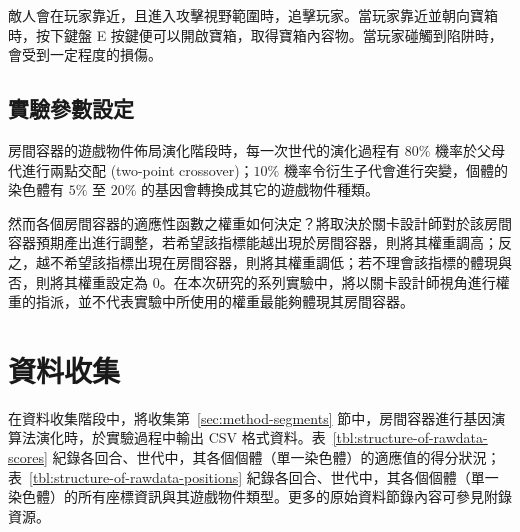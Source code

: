 敵人會在玩家靠近，且進入攻擊視野範圍時，追擊玩家。當玩家靠近並朝向寶箱時，按下鍵盤 E 按鍵便可以開啟寶箱，取得寶箱內容物。當玩家碰觸到陷阱時，會受到一定程度的損傷。







\subsection{實驗參數設定}
\label{ssec:experiment-parameters}


房間容器的遊戲物件佈局演化階段時，每一次世代的演化過程有 $80\%$ 機率於父母代進行兩點交配 (two-point crossover)；$10\%$ 機率令衍生子代會進行突變，個體的染色體有 $5\%$ 至 $20\%$ 的基因會轉換成其它的遊戲物件種類。

然而各個房間容器的適應性函數之權重如何決定？將取決於關卡設計師對於該房間容器預期產出進行調整，若希望該指標能越出現於房間容器，則將其權重調高；反之，越不希望該指標出現在房間容器，則將其權重調低；若不理會該指標的體現與否，則將其權重設定為 $0$。在本次研究的系列實驗中，將以關卡設計師視角進行權重的指派，並不代表實驗中所使用的權重最能夠體現其房間容器。

\section{資料收集}
\label{sec:experiment-datacollection}

在資料收集階段中，將收集第~\ref{sec:method-segments} 節中，房間容器進行基因演算法演化時，於實驗過程中輸出 CSV 格式資料。表~\ref{tbl:structure-of-rawdata-scores} 紀錄各回合、世代中，其各個個體（單一染色體）的適應值的得分狀況；表~\ref{tbl:structure-of-rawdata-positions} 紀錄各回合、世代中，其各個個體（單一染色體）的所有座標資訊與其遊戲物件類型。更多的原始資料節錄內容可參見附錄資源。

